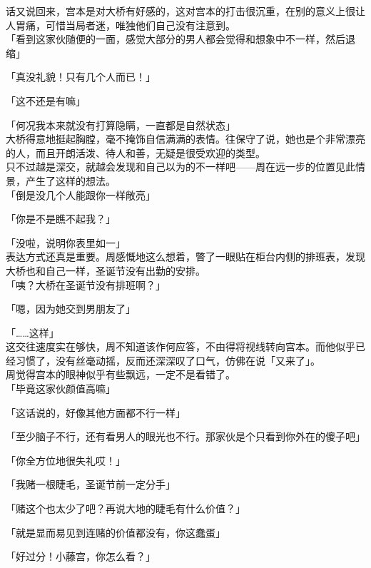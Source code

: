 话又说回来，宫本是对大桥有好感的，这对宫本的打击很沉重，在别的意义上很让人胃痛，可惜当局者迷，唯独他们自己没有注意到。\\

「看到这家伙随便的一面，感觉大部分的男人都会觉得和想象中不一样，然后退缩」

「真没礼貌！只有几个人而已！」

「这不还是有嘛」

「何况我本来就没有打算隐瞒，一直都是自然状态」\\

大桥得意地挺起胸膛，毫不掩饰自信满满的表情。往保守了说，她也是个非常漂亮的人，而且开朗活泼、待人和善，无疑是很受欢迎的类型。\\

只不过越是深交，就越会发现和自己以为的不一样吧——周在远一步的位置见此情景，产生了这样的想法。\\

「倒是没几个人能跟你一样敞亮」

「你是不是瞧不起我？」

「没啦，说明你表里如一」\\

表达方式还真是重要。周感慨地这么想着，瞥了一眼贴在柜台内侧的排班表，发现大桥也和自己一样，圣诞节没有出勤的安排。\\

「咦？大桥在圣诞节没有排班啊？」

「嗯，因为她交到男朋友了」

「……这样」\\

这交往速度实在够快，周不知道该作何应答，不由得将视线转向宫本。而他似乎已经习惯了，没有丝毫动摇，反而还深深叹了口气，仿佛在说「又来了」。\\

周觉得宫本的眼神似乎有些飘远，一定不是看错了。\\

「毕竟这家伙颜值高嘛」

「这话说的，好像其他方面都不行一样」

「至少脑子不行，还有看男人的眼光也不行。那家伙是个只看到你外在的傻子吧」

「你全方位地很失礼哎！」

「我赌一根睫毛，圣诞节前一定分手」

「赌这个也太少了吧？再说大地的睫毛有什么价值？」

「就是显而易见到连赌的价值都没有，你这蠢蛋」

「好过分！小藤宫，你怎么看？」

